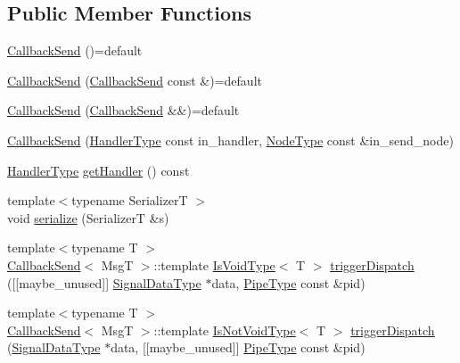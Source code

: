 \subsection*{Public Member Functions}
\begin{DoxyCompactItemize}
\item 
\hyperlink{structvt_1_1pipe_1_1callback_1_1_callback_send_aad073e948c05410190ba09425772d3a3}{Callback\+Send} ()=default
\item 
\hyperlink{structvt_1_1pipe_1_1callback_1_1_callback_send_ae45cdb5d7d006708d6bbae455c4a22d1}{Callback\+Send} (\hyperlink{structvt_1_1pipe_1_1callback_1_1_callback_send}{Callback\+Send} const \&)=default
\item 
\hyperlink{structvt_1_1pipe_1_1callback_1_1_callback_send_accc854042b241e9e5149f4c48da57ed1}{Callback\+Send} (\hyperlink{structvt_1_1pipe_1_1callback_1_1_callback_send}{Callback\+Send} \&\&)=default
\item 
\hyperlink{structvt_1_1pipe_1_1callback_1_1_callback_send_a97b27637052dc74f0f500f250ddbb9b7}{Callback\+Send} (\hyperlink{namespacevt_af64846b57dfcaf104da3ef6967917573}{Handler\+Type} const in\+\_\+handler, \hyperlink{namespacevt_a866da9d0efc19c0a1ce79e9e492f47e2}{Node\+Type} const \&in\+\_\+send\+\_\+node)
\item 
\hyperlink{namespacevt_af64846b57dfcaf104da3ef6967917573}{Handler\+Type} \hyperlink{structvt_1_1pipe_1_1callback_1_1_callback_send_ad02a9711c4603807d6fe40a5dd3b4859}{get\+Handler} () const
\item 
{\footnotesize template$<$typename SerializerT $>$ }\\void \hyperlink{structvt_1_1pipe_1_1callback_1_1_callback_send_ae3abb8abfeee32b445a4ff13fd591745}{serialize} (SerializerT \&s)
\item 
{\footnotesize template$<$typename T $>$ }\\\hyperlink{structvt_1_1pipe_1_1callback_1_1_callback_send}{Callback\+Send}$<$ MsgT $>$\+::template \hyperlink{structvt_1_1pipe_1_1callback_1_1_callback_send_afbb9475a84ba4a7b3db3c7493672dbe6}{Is\+Void\+Type}$<$ T $>$ \hyperlink{structvt_1_1pipe_1_1callback_1_1_callback_send_a16db9d40d276751126e8d279c6919d71}{trigger\+Dispatch} (\mbox{[}\mbox{[}maybe\+\_\+unused\mbox{]}\mbox{]} \hyperlink{structvt_1_1pipe_1_1callback_1_1_callback_send_a5b21820f25b28f980921b1fe24d8a2dc}{Signal\+Data\+Type} $\ast$data, \hyperlink{namespacevt_ac9852acda74d1896f48f406cd72c7bd3}{Pipe\+Type} const \&pid)
\item 
{\footnotesize template$<$typename T $>$ }\\\hyperlink{structvt_1_1pipe_1_1callback_1_1_callback_send}{Callback\+Send}$<$ MsgT $>$\+::template \hyperlink{structvt_1_1pipe_1_1callback_1_1_callback_send_adb85e64e67e00aa71a9c173565dfb7dc}{Is\+Not\+Void\+Type}$<$ T $>$ \hyperlink{structvt_1_1pipe_1_1callback_1_1_callback_send_a5b9348d4e16bfc8718638bf2a2d06e20}{trigger\+Dispatch} (\hyperlink{structvt_1_1pipe_1_1callback_1_1_callback_send_a5b21820f25b28f980921b1fe24d8a2dc}{Signal\+Data\+Type} $\ast$data, \mbox{[}\mbox{[}maybe\+\_\+unused\mbox{]}\mbox{]} \hyperlink{namespacevt_ac9852acda74d1896f48f406cd72c7bd3}{Pipe\+Type} const \&pid)
\end{DoxyCompactItemize}
